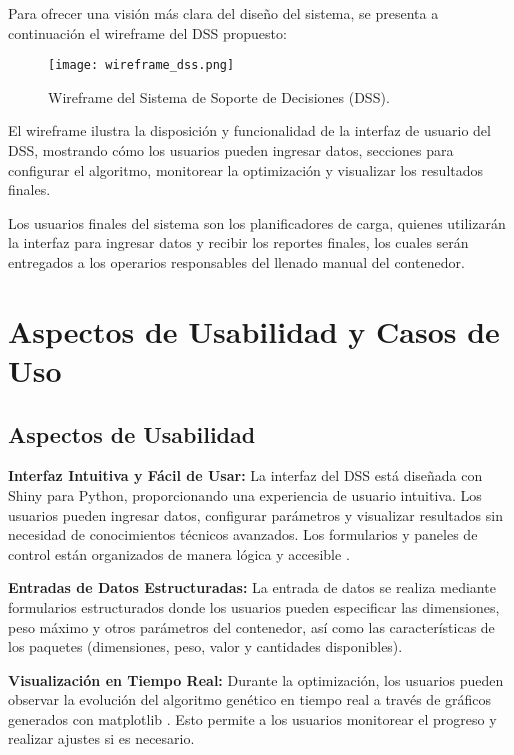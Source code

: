 \documentclass[9pt,a4paper]{rho}
\begin{document}
Para ofrecer una visión más clara del diseño del sistema, se presenta a continuación el wireframe del DSS propuesto:

\begin{figure}[h!]
    \centering
    \texttt{[image: wireframe\_dss.png]}
    \caption{Wireframe del Sistema de Soporte de Decisiones (DSS).}
    \label{fig:wireframe_dss}
\end{figure}

El wireframe ilustra la disposición y funcionalidad de la interfaz de usuario del DSS, mostrando cómo los usuarios pueden ingresar datos, secciones para configurar el algoritmo, monitorear la optimización y visualizar los resultados finales.

Los usuarios finales del sistema son los planificadores de carga, quienes utilizarán la interfaz para ingresar datos y recibir los reportes finales, los cuales serán entregados a los operarios responsables del llenado manual del contenedor.

\section{Aspectos de Usabilidad y Casos de Uso}

\subsection{Aspectos de Usabilidad}
\textbf{Interfaz Intuitiva y Fácil de Usar:} La interfaz del DSS está diseñada con Shiny para Python, proporcionando una experiencia de usuario intuitiva. Los usuarios pueden ingresar datos, configurar parámetros y visualizar resultados sin necesidad de conocimientos técnicos avanzados. Los formularios y paneles de control están organizados de manera lógica y accesible \cite{shiny_intro}.

\textbf{Entradas de Datos Estructuradas:} La entrada de datos se realiza mediante formularios estructurados donde los usuarios pueden especificar las dimensiones, peso máximo y otros parámetros del contenedor, así como las características de los paquetes (dimensiones, peso, valor y cantidades disponibles).

\textbf{Visualización en Tiempo Real:} Durante la optimización, los usuarios pueden observar la evolución del algoritmo genético en tiempo real a través de gráficos generados con matplotlib \cite{matplotlib}. Esto permite a los usuarios monitorear el progreso y realizar ajustes si es necesario.
\end{document}
